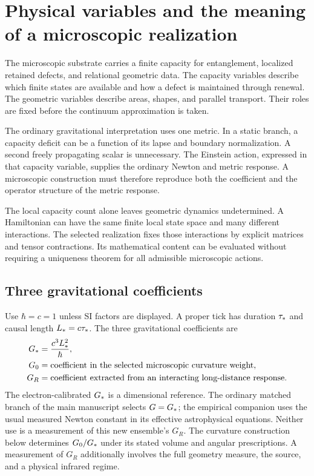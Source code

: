 \section{Physical variables and the meaning of a microscopic realization}
\label{sec:premises}

The microscopic substrate carries a finite capacity for entanglement, localized retained defects, and relational geometric data. The capacity variables describe which finite states are available and how a defect is maintained through renewal. The geometric variables describe areas, shapes, and parallel transport. Their roles are fixed before the continuum approximation is taken.

The ordinary gravitational interpretation uses one metric. In a static branch, a capacity deficit can be a function of its lapse and boundary normalization. A second freely propagating scalar is unnecessary. The Einstein action, expressed in that capacity variable, supplies the ordinary Newton and metric response. A microscopic construction must therefore reproduce both the coefficient and the operator structure of the metric response.

The local capacity count alone leaves geometric dynamics undetermined. A Hamiltonian can have the same finite local state space and many different interactions. The selected realization fixes those interactions by explicit matrices and tensor contractions. Its mathematical content can be evaluated without requiring a uniqueness theorem for all admissible microscopic actions.

\subsection{Three gravitational coefficients}
\label{sec:threeG}

Use $\hbar=c=1$ unless SI factors are displayed. A proper tick has duration $\tau_*$ and causal length $L_*=c\tau_*$. The three gravitational coefficients are
\begin{align}
G_*&=\frac{c^3L_*^2}{\hbar},\\
G_0&=\text{coefficient in the selected microscopic curvature weight},\\
G_R&=\text{coefficient extracted from an interacting long-distance response}.
\end{align}
The electron-calibrated $G_*$ is a dimensional reference. The ordinary matched branch of the main manuscript selects $G=G_*$; the empirical companion uses the usual measured Newton constant in its effective astrophysical equations. Neither use is a measurement of this new ensemble's $G_R$. The curvature construction below determines $G_0/G_*$ under its stated volume and angular prescriptions. A measurement of $G_R$ additionally involves the full geometry measure, the source, and a physical infrared regime.

